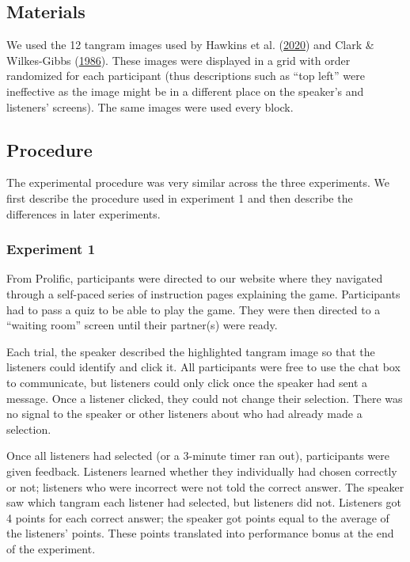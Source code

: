 \documentclass[
  english,
  a4paper,
]{article}
\begin{document}
\hypertarget{materials}{%
\subsection{Materials}\label{materials}}

We used the 12 tangram images used by Hawkins et al. (\protect\hyperlink{ref-hawkinsCharacterizingDynamicsLearning2020}{2020}) and Clark \& Wilkes-Gibbs (\protect\hyperlink{ref-clarkReferringCollaborativeProcess1986}{1986}). These images were displayed in a grid with order randomized for each participant (thus descriptions such as ``top left'' were ineffective as the image might be in a different place on the speaker's and listeners' screens). The same images were used every block.

\hypertarget{procedure}{%
\subsection{Procedure}\label{procedure}}

The experimental procedure was very similar across the three experiments. We first describe the procedure used in experiment 1 and then describe the differences in later experiments.

\hypertarget{experiment-1}{%
\subsubsection{Experiment 1}\label{experiment-1}}

From Prolific, participants were directed to our website where they navigated through a self-paced series of instruction pages explaining the game. Participants had to pass a quiz to be able to play the game. They were then directed to a ``waiting room'' screen until their partner(s) were ready.

Each trial, the speaker described the highlighted tangram image so that the listeners could identify and click it. All participants were free to use the chat box to communicate, but listeners could only click once the speaker had sent a message. Once a listener clicked, they could not change their selection. There was no signal to the speaker or other listeners about who had already made a selection.

Once all listeners had selected (or a 3-minute timer ran out), participants were given feedback. Listeners learned whether they individually had chosen correctly or not; listeners who were incorrect were not told the correct answer. The speaker saw which tangram each listener had selected, but listeners did not. Listeners got 4 points for each correct answer; the speaker got points equal to the average of the listeners' points. These points translated into performance bonus at the end of the experiment.
\end{document}
